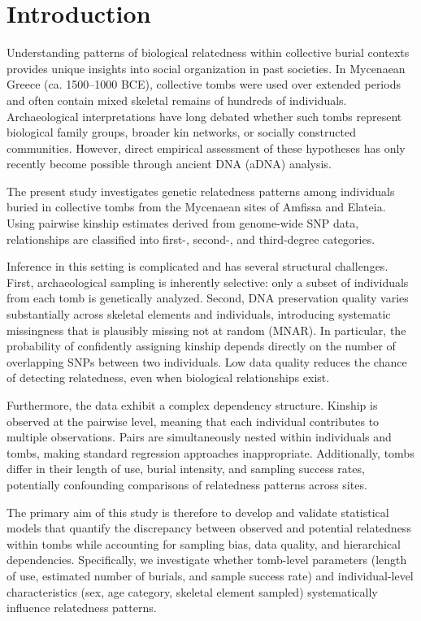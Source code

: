 \documentclass[
]{ajs}
\author{
\\
}
\title{}
\begin{document}
\section{Introduction}\label{introduction}

Understanding patterns of biological relatedness within collective
burial contexts provides unique insights into social organization in
past societies. In Mycenaean Greece (ca. 1500--1000 BCE), collective
tombs were used over extended periods and often contain mixed skeletal
remains of hundreds of individuals. Archaeological interpretations have
long debated whether such tombs represent biological family groups,
broader kin networks, or socially constructed communities. However,
direct empirical assessment of these hypotheses has only recently become
possible through ancient DNA (aDNA) analysis.

The present study investigates genetic relatedness patterns among
individuals buried in collective tombs from the Mycenaean sites of
Amfissa and Elateia. Using pairwise kinship estimates derived from
genome-wide SNP data, relationships are classified into first-, second-,
and third-degree categories.

Inference in this setting is complicated and has several structural
challenges. First, archaeological sampling is inherently selective: only
a subset of individuals from each tomb is genetically analyzed. Second,
DNA preservation quality varies substantially across skeletal elements
and individuals, introducing systematic missingness that is plausibly
missing not at random (MNAR). In particular, the probability of
confidently assigning kinship depends directly on the number of
overlapping SNPs between two individuals. Low data quality reduces the
chance of detecting relatedness, even when biological relationships
exist.

Furthermore, the data exhibit a complex dependency structure. Kinship is
observed at the pairwise level, meaning that each individual contributes
to multiple observations. Pairs are simultaneously nested within
individuals and tombs, making standard regression approaches
inappropriate. Additionally, tombs differ in their length of use, burial
intensity, and sampling success rates, potentially confounding
comparisons of relatedness patterns across sites.

The primary aim of this study is therefore to develop and validate
statistical models that quantify the discrepancy between observed and
potential relatedness within tombs while accounting for sampling bias,
data quality, and hierarchical dependencies. Specifically, we
investigate whether tomb-level parameters (length of use, estimated
number of burials, and sample success rate) and individual-level
characteristics (sex, age category, skeletal element sampled)
systematically influence relatedness patterns.
\end{document}
